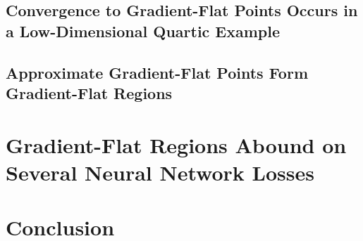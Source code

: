 \documentclass[../../thesis.tex]{subfiles}
\begin{document}
\subsection{Convergence to Gradient-Flat Points Occurs in a Low-Dimensional Quartic Example}%

\subsection{Approximate Gradient-Flat Points Form Gradient-Flat Regions}%

\section{Gradient-Flat Regions Abound on Several Neural Network Losses}%

\section{Conclusion}%

\onlyinsubfile{\printbibliography}
\end{document}
